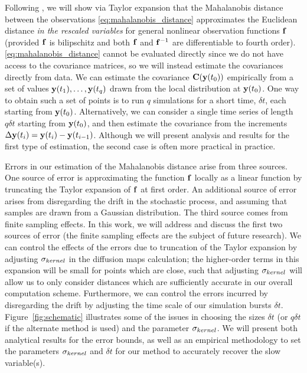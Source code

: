 Following \cite{singer2008non}, we will show via Taylor expansion that the Mahalanobis distance between the observations \eqref{eq:mahalanobis_distance} approximates the Euclidean
distance {\em in the rescaled variables} for general nonlinear observation functions $\mathbf{f}$ (provided $\mathbf{f}$ is bilipschitz and both $\mathbf{f}$ and $\mathbf{f}^{-1}$ are differentiable to fourth order).
%
\eqref{eq:mahalanobis_distance} cannot be evaluated directly since we do not have access to the covariance matrices, so we will instead estimate the covariances directly from data.
%
We can estimate the covariance $\mathbf{C}(\mathbf{y}(t_0))$ empirically from a set of values $\mathbf{y}(t_1), \dots, \mathbf{y}(t_q)$ drawn from the local distribution at $\mathbf{y}(t_0)$.
%
One way to obtain such a set of points is to run $q$ simulations for a short time, $\delta t$, each starting from $\mathbf{y}(t_0)$.
%
Alternatively, we can consider a single time series of length $q \delta t$ starting from $\mathbf{y}(t_0)$, and then estimate the covariance
from the increments $\Delta \mathbf{y}(t_i) = \mathbf{y}(t_i) -\mathbf{y}(t_{i-1})$.
%
Although we will present analysis and results for the first type of estimation, the second case is often more practical in practice.
%

Errors in our estimation of the Mahalanobis distance arise from three sources.
%
One source of error is approximating the function $\mathbf{f}$ locally as a linear function by truncating the Taylor expansion of $\mathbf{f}$ at first order.
%
An additional source of error arises from disregarding the drift in the stochastic process, and assuming that samples are drawn from a Gaussian distribution.
%
The third source comes from finite sampling effects.
%
In this work, we will address and discuss the first two sources of error (the finite sampling effects are the subject of future research).
%
We can control the effects of the errors due to truncation of the Taylor expansion by adjusting $\sigma_{kernel}$ in the diffusion maps calculation; the higher-order terms in this expansion will be small for points which are close, such that adjusting $\sigma_{kernel}$ will allow us to only consider distances which are
sufficiently accurate in our overall computation scheme.
%
Furthermore, we can control the errors incurred by disregarding the drift by adjusting the time scale of our simulation bursts $\delta t$.
%
Figure~\ref{fig:schematic} illustrates some of the issues in choosing the sizes $\delta t$ (or $q \delta t$ if the alternate method is used) and the parameter $\sigma_{kernel}$.
%
We will present both analytical results for the error bounds, as well as an empirical methodology to set the parameters $\sigma_{kernel}$ and $\delta t$ for our method to accurately recover the slow variable(s).

